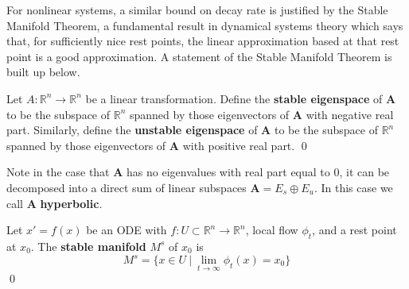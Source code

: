 For nonlinear systems, a similar bound on decay rate is justified by the Stable Manifold Theorem, a fundamental result in dynamical systems theory which says that, for sufficiently nice rest points, the linear approximation based at that rest point is a good approximation. %
%
%
%
A statement of the Stable Manifold Theorem is built up below. 

\begin{definition}
	Let $A: \mathbb{R}^n \to \mathbb{R}^n$ be a linear transformation. Define the \textbf{stable eigenspace} of $\mathbf{A}$ to be the subspace of $\mathbb{R}^n$ spanned by those eigenvectors of $\mathbf{A}$ with negative real part. Similarly, define the \textbf{unstable eigenspace} of $\mathbf{A}$ to be the subspace of $\mathbb{R}^n$ spanned by those eigenvectors of $\mathbf{A}$ with positive real part. %
	\qed
\end{definition}

Note in the case that $\mathbf{A}$ has no eigenvalues with real part equal to 0, it can be decomposed into a direct sum of linear subspaces $\mathbf{A} = E_s \oplus E_u$. In this case we call $\mathbf{A}$ \textbf{hyperbolic}.

\begin{definition}
	Let $x' = f(x)$ be an ODE with $f:U \subset \mathbb{R}^n \to \mathbb{R}^n$, local flow $\phi_t$, and a rest point at $x_0$. The \textbf{stable manifold} $M^s$ %
	of $x_0$ is %
	$$M^s = \{x \in U ~|~ \lim\limits_{t \to \infty} \phi_t(x)= x_0\}$$ 
	\qed
\end{definition}


